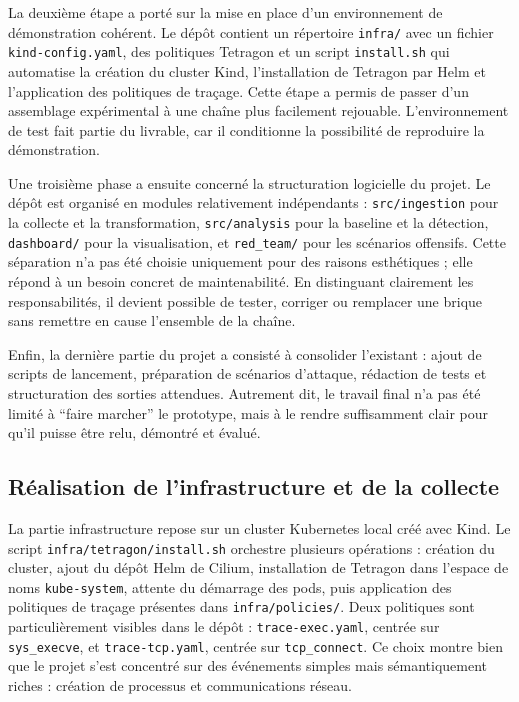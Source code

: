 \documentclass[a4paper,12pt]{article}
\begin{document}
La deuxième étape a porté sur la mise en place d'un environnement de démonstration cohérent. Le dépôt contient un répertoire \texttt{infra/} avec un fichier \texttt{kind-config.yaml}, des politiques Tetragon et un script \texttt{install.sh} qui automatise la création du cluster Kind, l'installation de Tetragon par Helm et l'application des politiques de traçage. Cette étape a permis de passer d'un assemblage expérimental à une chaîne plus facilement rejouable. L'environnement de test fait partie du livrable, car il conditionne la possibilité de reproduire la démonstration.

Une troisième phase a ensuite concerné la structuration logicielle du projet. Le dépôt est organisé en modules relativement indépendants : \texttt{src/ingestion} pour la collecte et la transformation, \texttt{src/analysis} pour la baseline et la détection, \texttt{dashboard/} pour la visualisation, et \texttt{red\_team/} pour les scénarios offensifs. Cette séparation n'a pas été choisie uniquement pour des raisons esthétiques ; elle répond à un besoin concret de maintenabilité. En distinguant clairement les responsabilités, il devient possible de tester, corriger ou remplacer une brique sans remettre en cause l'ensemble de la chaîne.

Enfin, la dernière partie du projet a consisté à consolider l'existant : ajout de scripts de lancement, préparation de scénarios d'attaque, rédaction de tests et structuration des sorties attendues. Autrement dit, le travail final n'a pas été limité à ``faire marcher'' le prototype, mais à le rendre suffisamment clair pour qu'il puisse être relu, démontré et évalué.

\subsection{Réalisation de l'infrastructure et de la collecte}

La partie infrastructure repose sur un cluster Kubernetes local créé avec Kind. Le script \texttt{infra/tetragon/install.sh} orchestre plusieurs opérations : création du cluster, ajout du dépôt Helm de Cilium, installation de Tetragon dans l'espace de noms \texttt{kube-system}, attente du démarrage des pods, puis application des politiques de traçage présentes dans \texttt{infra/policies/}. Deux politiques sont particulièrement visibles dans le dépôt : \texttt{trace-exec.yaml}, centrée sur \texttt{sys\_execve}, et \texttt{trace-tcp.yaml}, centrée sur \texttt{tcp\_connect}. Ce choix montre bien que le projet s'est concentré sur des événements simples mais sémantiquement riches : création de processus et communications réseau.
\end{document}
